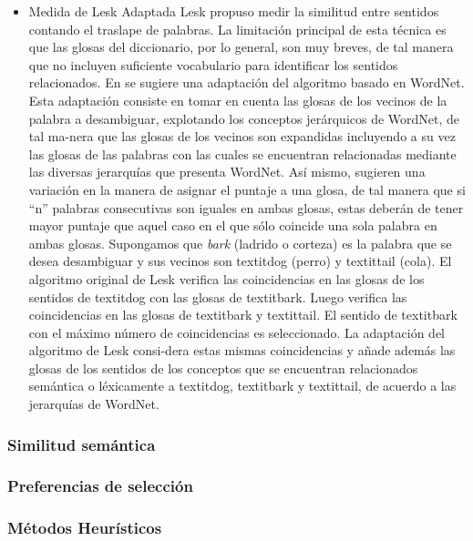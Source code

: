 \begin{itemize}
  \item Medida de Lesk Adaptada
    Lesk propuso medir la similitud entre sentidos contando el traslape de palabras. La limitación principal de esta técnica es que las glosas del diccionario, por lo general, son muy breves, de tal manera que no incluyen suficiente vocabulario para identificar los sentidos relacionados. En \cite{006} se sugiere una adaptación del algoritmo basado en WordNet. Esta adaptación consiste en tomar en cuenta las glosas de los vecinos de la palabra a desambiguar, explotando los conceptos jerárquicos de WordNet, de tal ma-nera que las glosas de los vecinos son expandidas incluyendo a su vez las glosas de las palabras con las cuales se encuentran relacionadas mediante las diversas jerarquías que presenta WordNet. Así mismo, sugieren una variación en la manera de asignar el puntaje a una glosa, de tal manera que si “n” palabras consecutivas son iguales en ambas glosas, estas deberán de tener mayor puntaje que aquel caso en el que sólo coincide una sola palabra en ambas glosas.
    Supongamos que \textit{bark} (ladrido o corteza) es la palabra que se desea desambiguar y sus vecinos son textit{dog} (perro) y textit{tail} (cola). El algoritmo original de Lesk verifica las coincidencias en las glosas de los sentidos de textit{dog} con las glosas de textit{bark}. Luego verifica las coincidencias en las glosas de textit{bark} y textit{tail}. El sentido de textit{bark} con el máximo número de coincidencias es seleccionado. La adaptación del algoritmo de Lesk consi-dera estas mismas coincidencias y añade además las glosas de los sentidos de los conceptos que se encuentran relacionados semántica o léxicamente a textit{dog}, textit{bark} y textit{tail}, de acuerdo a las jerarquías de WordNet.
\end{itemize}

\subsubsection{Similitud semántica}
\subsubsection{Preferencias de selección}
\subsubsection{Métodos Heurísticos}

